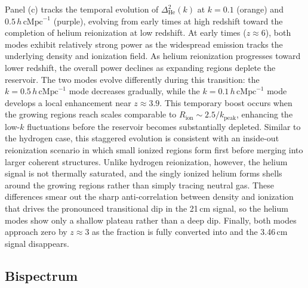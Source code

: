 \documentclass[apj,twocolumn, appendixfloats, twocolappendix, numberedappendix, tighten]{openjournal}
\begin{document}
Panel (c) tracks the temporal evolution of $\Delta^2_\mathrm{He}(k)$ at $k = 0.1$ (orange) and $0.5\,h\,\mathrm{cMpc}^{-1}$ (purple), evolving from early times at high redshift toward the completion of helium reionization at low redshift. At early times ($z \approx 6$), both modes exhibit relatively strong power as the widespread  emission tracks the underlying density and ionization field. As helium reionization progresses toward lower redshift, the overall power declines as expanding  regions deplete the  reservoir. The two modes evolve differently during this transition: the $k = 0.5\,h\,\mathrm{cMpc}^{-1}$ mode decreases gradually, while the $k = 0.1\,h\,\mathrm{cMpc}^{-1}$ mode develops a local enhancement near $z \approx 3.9$. This temporary boost occurs when the growing  regions reach scales comparable to $R_\mathrm{ion} \sim 2.5/k_\mathrm{peak}$, enhancing the low-$k$ fluctuations before the  reservoir becomes substantially depleted. Similar to the hydrogen case, this staggered evolution is consistent with an inside-out reionization scenario in which small ionized regions form first before merging into larger coherent structures. Unlike hydrogen reionization, however, the helium signal is not thermally saturated, and the singly ionized helium forms shells around the growing  regions rather than simply tracing neutral gas. These differences smear out the sharp anti-correlation between density and ionization that drives the pronounced transitional dip in the 21\,cm signal, so the helium modes show only a shallow plateau rather than a deep dip.  Finally, both modes approach zero by $z \approx 3$ as the  fraction is fully converted into  and the 3.46\,cm signal disappears.




\subsection{Bispectrum} \label{sec:bispectrum}


\end{document}
